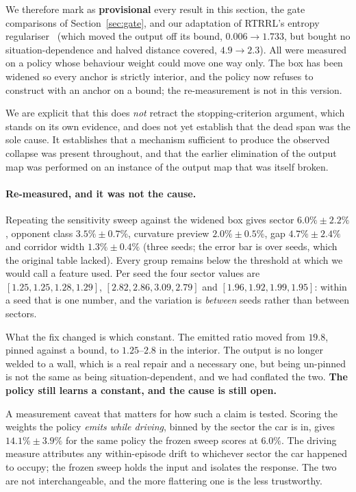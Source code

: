 \documentclass[letterpaper, 10 pt, conference]{ieeeconf}
\begin{document}
We therefore mark as \textbf{provisional} every result in this section, the
gate comparisons of Section~\ref{sec:gate}, and our adaptation of RTRRL's
entropy regulariser~\cite{lemmel2023rtrrl} (which moved the output off its
bound, $0.006 \to 1.733$, but bought no situation-dependence and halved
distance covered, $4.9 \to 2.3$). All were measured on a policy whose behaviour
weight could move one way only. The box has been widened so every anchor is
strictly interior, and the policy now refuses to construct with an anchor on a
bound; the re-measurement is not in this version.

We are explicit that this does \emph{not} retract the stopping-criterion
argument, which stands on its own evidence, and does not yet establish that the
dead span was the sole cause. It establishes that a mechanism sufficient to
produce the observed collapse was present throughout, and that the earlier
elimination of the output map was performed on an instance of the output map
that was itself broken.

\paragraph{Re-measured, and it was not the cause.} Repeating the sensitivity
sweep against the widened box gives sector $6.0\% \pm 2.2\%$, opponent class
$3.5\% \pm 0.7\%$, curvature preview $2.0\% \pm 0.5\%$, gap $4.7\% \pm 2.4\%$
and corridor width $1.3\% \pm 0.4\%$ (three seeds; the error bar is over seeds,
which the original table lacked). Every group remains below the threshold at
which we would call a feature used. Per seed the four sector values are
$[1.25, 1.25, 1.28, 1.29]$, $[2.82, 2.86, 3.09, 2.79]$ and
$[1.96, 1.92, 1.99, 1.95]$: within a seed that is one number, and the variation
is \emph{between} seeds rather than between sectors.

What the fix changed is which constant. The emitted ratio moved from $19.8$,
pinned against a bound, to $1.25$--$2.8$ in the interior. The output is no
longer welded to a wall, which is a real repair and a necessary one, but being
un-pinned is not the same as being situation-dependent, and we had conflated
the two. \textbf{The policy still learns a constant, and the cause is still
open.}

A measurement caveat that matters for how such a claim is tested. Scoring the
weights the policy \emph{emits while driving}, binned by the sector the car is
in, gives $14.1\% \pm 3.9\%$ for the same policy the frozen sweep scores at
$6.0\%$. The driving measure attributes any within-episode drift to whichever
sector the car happened to occupy; the frozen sweep holds the input and
isolates the response. The two are not interchangeable, and the more flattering
one is the less trustworthy.
\end{document}
